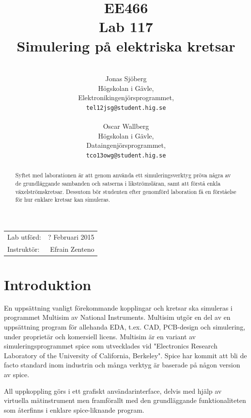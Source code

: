 \documentclass[11pt,a4paper]{article}
\title{EE466 \\ Lab 117 \\ Simulering på elektriska kretsar}
\author{\\
  Jonas Sjöberg\\
  Högskolan i Gävle,\\
  Elektronikingenjörsprogrammet,\\
  \texttt{tel12jsg@student.hig.se}\\
  \\
  Oscar Wallberg\\
  Högskolan i Gävle,\\
  Dataingenjörsprogrammet,\\
  \texttt{tco13owg@student.hig.se}\\}
\date{}
\begin{document}
\maketitle

\begin{center}
    \begin{tabular}{l r}
        Lab utförd: & ? Februari 2015 \\
        Instruktör: & Efrain Zenteno
    \end{tabular}
\end{center}

\begin{abstract}
    Syftet med laborationen är att genom använda ett simuleringsverktyg pröva
    några av de grundläggande sambanden och satserna i likströmsläran, samt att
    förstå enkla växelströmskretsar. Dessutom bör studenten efter genomförd
    laboration få en förståelse för hur enklare kretsar kan simuleras.
\end{abstract}

\newpage

{
    \setcounter{tocdepth}{3}
    \tableofcontents
}

\newpage

\section{Introduktion}\label{setup}
En uppsättning vanligt förekommande kopplingar och kretsar ska simuleras i
programmet Multisim av National Instruments. Multisim utgör en del av en uppsättning program
för allehanda EDA, t.ex. CAD, PCB-design och simulering, under proprietär och
komersiell licens. Multisim är en variant av simuleringsprogrammet spice som
utvecklades vid "Electronics Research Laboratory of the University of
California, Berkeley". Spice har kommit att bli de facto standard inom
industrin och många verktyg är baserade på någon version av spice.

All uppkoppling görs i ett grafiskt användarinterface, delvis med hjälp av 
virtuella mätinstrument men framförallt med den grundläggande funktionaliteten
som återfinns i enklare spice-liknande program.
\end{document}
